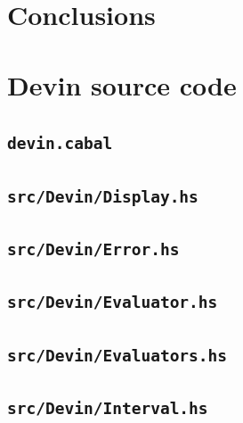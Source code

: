 \documentclass[UdineBachThesis,american,11pt]{PhdThesis}
\begin{document}
  \chapter{Conclusions}


  \newpage

  \thispagestyle{empty}

  \backmatter

  \appendix

  \chapter{Devin source code}

  \section{\texttt{devin.cabal}}

  

  \section{\texttt{src/Devin/Display.hs}}

  

  \section{\texttt{src/Devin/Error.hs}}

  

  \section{\texttt{src/Devin/Evaluator.hs}}

  

  \section{\texttt{src/Devin/Evaluators.hs}}

  

  \section{\texttt{src/Devin/Interval.hs}}
\end{document}
